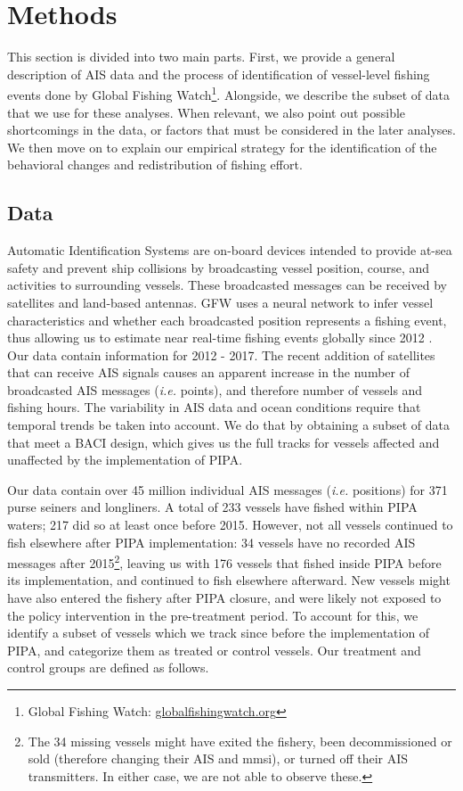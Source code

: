 \documentclass[12pt,]{article}
\let\rmarkdownfootnote\footnote%
\def\footnote{\protect\rmarkdownfootnote}
\begin{document}
\hypertarget{methods}{%
\section{Methods}\label{methods}}

This section is divided into two main parts. First, we provide a general
description of AIS data and the process of identification of
vessel-level fishing events done by Global Fishing Watch\footnote{Global
  Fishing Watch: \url{globalfishingwatch.org}}. Alongside, we describe
the subset of data that we use for these analyses. When relevant, we
also point out possible shortcomings in the data, or factors that must
be considered in the later analyses. We then move on to explain our
empirical strategy for the identification of the behavioral changes and
redistribution of fishing effort.

\hypertarget{data}{%
\subsection{Data}\label{data}}

Automatic Identification Systems are on-board devices intended to
provide at-sea safety and prevent ship collisions by broadcasting vessel
position, course, and activities to surrounding vessels. These
broadcasted messages can be received by satellites and land-based
antennas. GFW uses a neural network to infer vessel characteristics and
whether each broadcasted position represents a fishing event, thus
allowing us to estimate near real-time fishing events globally since
2012 \citep{kroodsma_2018}. Our data contain information for 2012 -
2017. The recent addition of satellites that can receive AIS signals
causes an apparent increase in the number of broadcasted AIS messages
(\emph{i.e.} points), and therefore number of vessels and fishing hours.
The variability in AIS data and ocean conditions require that temporal
trends be taken into account. We do that by obtaining a subset of data
that meet a BACI design, which gives us the full tracks for vessels
affected and unaffected by the implementation of PIPA.

Our data contain over 45 million individual AIS messages (\emph{i.e.}
positions) for 371 purse seiners and longliners. A total of 233 vessels
have fished within PIPA waters; 217 did so at least once before 2015.
However, not all vessels continued to fish elsewhere after PIPA
implementation: 34 vessels have no recorded AIS messages after
2015\footnote{The 34 missing vessels might have exited the fishery, been
  decommissioned or sold (therefore changing their AIS and mmsi), or
  turned off their AIS transmitters. In either case, we are not able to
  observe these.}, leaving us with 176 vessels that fished inside PIPA
before its implementation, and continued to fish elsewhere afterward.
New vessels might have also entered the fishery after PIPA closure, and
were likely not exposed to the policy intervention in the pre-treatment
period. To account for this, we identify a subset of vessels which we
track since before the implementation of PIPA, and categorize them as
treated or control vessels. Our treatment and control groups are defined
as follows.
\end{document}
